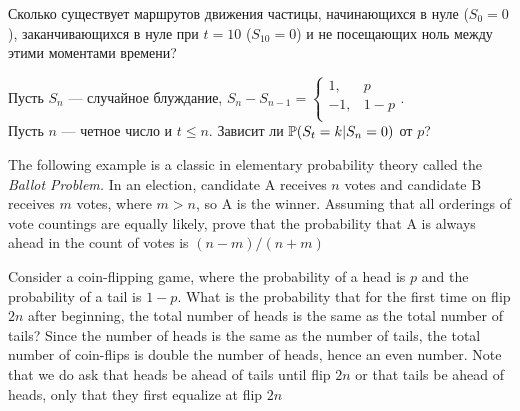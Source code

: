 \begin{solution}
\begin{solution}
\begin{solution}
\begin{solution}
\begin{solution}
\begin{solution}
\begin{solution}
\begin{solution}
{\begin{solution}
\end{solution}

\begin{problem}
Сколько существует маршрутов движения частицы, начинающихся в нуле
($S_{0}=0$), заканчивающихся в нуле при $t=10$ ($S_{10}=0$) и не
посещающих ноль между этими моментами времени? 
\end{problem} 
\begin{solution} 

\end{solution}

\begin{problem}
Пусть $S_{n}$ --- случайное блуждание, $S_{n}-S_{n-1}=
\begin{cases}
  1, & p \\
  -1, & 1-p \\
\end{cases}$. \\
Пусть $n$ --- четное число и $t\le n$. Зависит ли
$\P(S_{t}=k|S_{n}=0)$ от $p$?
\end{problem} 
\begin{solution} 

\end{solution}

\begin{problem}
 The following example is a classic in elementary probability theory called
the \emph{Ballot Problem.}  In an election, candidate A receives $n$
votes and candidate B receives $m$ votes, where $m > n$, so A is the
winner.  Assuming that all orderings of vote countings are equally
likely, prove that the probability that A is always ahead in the count of votes 
is $(n-m)/(n+m)$ 
\end{problem} 
\begin{solution} 

\end{solution}

\begin{problem}
   Consider a coin-flipping game, where the probability of a head is
  $p$ and the probability of a tail is $1-p$.  What is the probability
  that for the first time on flip $2n$ after beginning, the total number of
  heads is the same as the total number of tails?  Since the number of
  heads is the same as the number of tails, the total number of coin-flips
  is double the number of heads, hence an even number.  Note that we
  do ask that heads be ahead of tails until flip $2n$ or that tails be
  ahead of heads, only that they first equalize at flip $2n$


\end{problem}}
\end{solution}
\end{solution}
\end{solution}
\end{solution}
\end{solution}
\end{solution}
\end{solution}
\end{solution}

